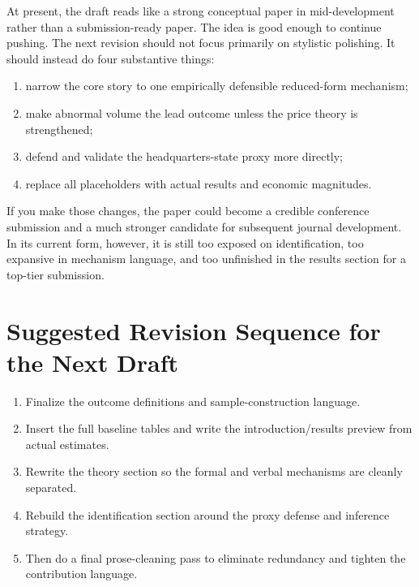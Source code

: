 \documentclass[12pt]{article}
\begin{document}
At present, the draft reads like a strong conceptual paper in mid-development rather than a submission-ready paper. The idea is good enough to continue pushing. The next revision should not focus primarily on stylistic polishing. It should instead do four substantive things:

\begin{enumerate}
    \item narrow the core story to one empirically defensible reduced-form mechanism;
    \item make abnormal volume the lead outcome unless the price theory is strengthened;
    \item defend and validate the headquarters-state proxy more directly;
    \item replace all placeholders with actual results and economic magnitudes.
\end{enumerate}

If you make those changes, the paper could become a credible conference submission and a much stronger candidate for subsequent journal development. In its current form, however, it is still too exposed on identification, too expansive in mechanism language, and too unfinished in the results section for a top-tier submission.

\section*{Suggested Revision Sequence for the Next Draft}

\begin{enumerate}
    \item Finalize the outcome definitions and sample-construction language.
    \item Insert the full baseline tables and write the introduction/results preview from actual estimates.
    \item Rewrite the theory section so the formal and verbal mechanisms are cleanly separated.
    \item Rebuild the identification section around the proxy defense and inference strategy.
    \item Then do a final prose-cleaning pass to eliminate redundancy and tighten the contribution language.
\end{enumerate}
\end{document}
